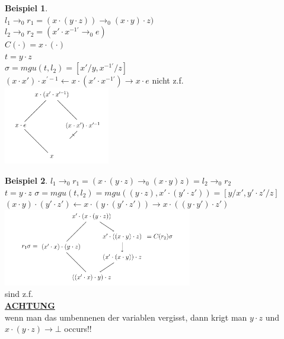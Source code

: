 \documentclass{article}
\theoremstyle{definition}
\newtheorem{beispiel}{Beispiel}[section]
\begin{document}
	\begin{beispiel}\ \\
	$l_1\to_0 r_1 = (x\cdot (y\cdot z))\to_0 (x\cdot y)\cdot z)$\\
	$l_2\to_0 r_2 = (x'\cdot x^{-1'}\to_0 e)$\\
	$C(\cdot) = x\cdot (\cdot)$\\
	$t=y\cdot z$\\
	$\sigma= mgu(t,l_2) = [x'/y, x^{-1'}/z]$\\
	$(x\cdot x')\cdot x^{'-1}\gets x\cdot (x'\cdot x^{-1'})\to x\cdot e$ nicht z.f.\\
	\includegraphics[height=128px]{images/nichtZF.png}\\
	\end{beispiel}
	\begin{beispiel}
	$l_1\to_0 r_1 = (x\cdot(y\cdot z)\to_0 (x\cdot y)z) = l_2\to_0 r_2$\\
	$t=y\cdot z$
	$\sigma = mgu(t,l_2)=mgu((y\cdot z), x'\cdot(y'\cdot z')) = [y/x', y'\cdot z'/z]$\\
	$(x\cdot y) \cdot (y'\cdot z')\gets x\cdot (y\cdot (y'\cdot z'))\to x\cdot ((y\cdot y')\cdot z')$\\
	\includegraphics[height=128px]{images/SelbstReferenzCriticalPair.png}\\
	sind z.f.\\
	\textbf{\underline{ACHTUNG}}\\
	wenn man das umbennenen der variablen vergisst, dann krigt man $y\cdot z$ und $x\cdot (y\cdot z)$$\longrightarrow \bot$ occurs!!\\
	\end{beispiel}
\end{document}
